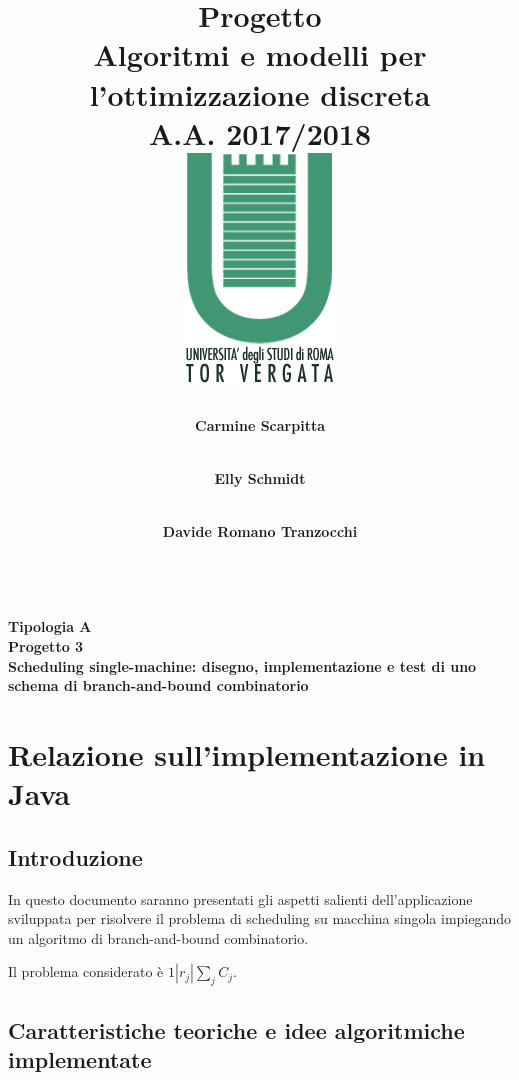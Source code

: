 \documentclass[12pt,a4paper]{report}
\author{
	\textbf{Carmine Scarpitta}\\
	\text{email}\\
	\text{matricola}
	\and
	\textbf{Elly Schmidt}\\
	\text{email}\\
	\text{matricola}
	\and
	\textbf{Davide Romano Tranzocchi}\\
	\text{email}\\
	\text{matricola}
}
\title{\Huge \textbf{Progetto\\
	\vspace{1mm}
	Algoritmi e modelli per l'ottimizzazione discreta \\
	\vspace{5mm}
	A.A. 2017/2018}\\
	\bigskip
	{\includegraphics[scale=0.6]{logoTV.png}}
}
\date{}
\begin{document}
	
\maketitle

\begin{center}
	\Huge \textbf{Tipologia A\\
	\vspace{5mm}
	Progetto 3\\
	\vspace{70mm}
	Scheduling single-machine: disegno, implementazione e test di uno schema di branch-and-bound combinatorio}
\end{center}

\tableofcontents

\chapter{Relazione sull'implementazione in Java}
\section{Introduzione}
	In questo documento saranno presentati gli aspetti salienti dell'applicazione sviluppata per risolvere il problema di scheduling su macchina singola impiegando un algoritmo di branch-and-bound combinatorio.
		
	Il problema considerato è $1 | r_j | \sum_{j} C_j$.

\section{Caratteristiche teoriche e idee algoritmiche implementate}
\end{document}

